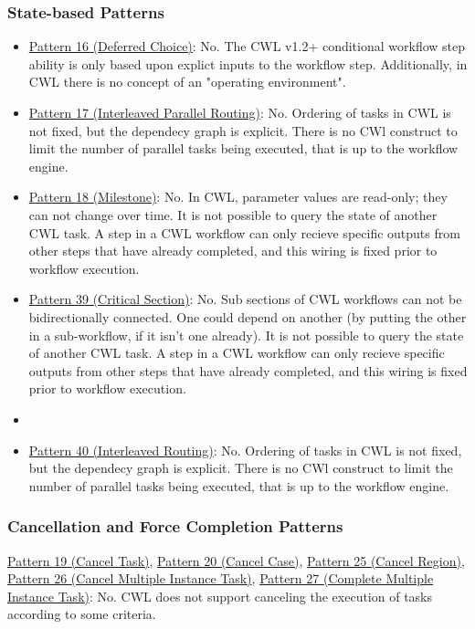 \subsubsection{State-based Patterns}
\begin{itemize}
\item \href{http://www.workflowpatterns.com/patterns/control/state/wcp16.php}{Pattern 16 (Deferred Choice)}: No. The CWL v1.2+ conditional workflow step ability is only based upon explict inputs to the workflow step. Additionally, in CWL there is no concept of an "operating environment".

\item \href{http://www.workflowpatterns.com/patterns/control/state/wcp17.php}{Pattern 17 (Interleaved Parallel Routing)}: No. Ordering of tasks in CWL is not fixed, but the dependecy graph is explicit. There is no CWl construct to limit the number of parallel tasks being executed, that is up to the workflow engine.

\item \href{http://www.workflowpatterns.com/patterns/control/state/wcp18.php}{Pattern 18 (Milestone)}: No. In CWL, parameter values are read-only; they can not change over time. It is not possible to query the state of another CWL task. A step in a CWL workflow can only recieve specific outputs from other steps that have already completed, and this wiring is fixed prior to workflow execution.

\item \href{http://www.workflowpatterns.com/patterns/control/new/wcp39.php}{Pattern 39 (Critical Section)}: No. Sub sections of CWL workflows can not be bidirectionally connected. One could depend on another (by putting the other in a sub-workflow, if it isn't one already). It is not possible to query the state of another CWL task. A step in a CWL workflow can only recieve specific outputs from other steps that have already completed, and this wiring is fixed prior to workflow execution.

\item \item \href{http://www.workflowpatterns.com/patterns/control/new/wcp40.php}{Pattern 40 (Interleaved Routing)}: No. Ordering of tasks in CWL is not fixed, but the dependecy graph is explicit. There is no CWl construct to limit the number of parallel tasks being executed, that is up to the workflow engine.
\end{itemize}
\subsubsection{Cancellation and Force Completion Patterns}
\href{http://www.workflowpatterns.com/patterns/control/cancellation/wcp19.php}{Pattern 19 (Cancel Task)}, \href{http://www.workflowpatterns.com/patterns/control/cancellation/wcp20.php}{Pattern 20 (Cancel Case)}, \href{http://www.workflowpatterns.com/patterns/control/new/wcp25.php}{Pattern 25 (Cancel Region)}, \href{http://www.workflowpatterns.com/patterns/control/new/wcp26.php}{Pattern 26 (Cancel Multiple Instance Task)}, \href{http://www.workflowpatterns.com/patterns/control/new/wcp27.php}{Pattern 27 (Complete Multiple Instance Task)}: No. CWL does not support canceling the execution of tasks according to some criteria.

